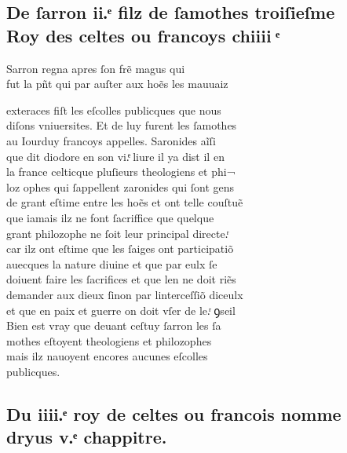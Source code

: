 \documentclass[12pt]{article}
\begin{document}
\subsection*{De ſarron ii.ͤ filz de ſamothes troiſieſme\protect\\ Roy des celtes ou francoys
          chiiii ͤ}


Sarron regna apres ſon frẽ magus qui\\
fut la pñt qui par auſter aux hoẽs les
          mauuaiz



\newpage




exteraces fiſt les eſcolles publicques que nous\\
diſons vniuersites.
          Et de luy furent les ſamothes\\
au Iourduy francoys appelles. Saronides aĩſi\\
que dit diodore en son vi.ͤ liure il ya dist il en\\
la
          france celticque pluſieurs theologiens et phi¬\\
loz ophes qui ſappellent
          zaronides qui ſont gens\\
de grant eſtime entre les hoẽs et ont telle couſtuẽ\\
que iamais ilz ne font ſacriffice que quelque\\
grant philozophe ne ſoit
          leur principal directe.ͬ\\
car ilz ont eſtime que les ſaiges ont participatiõ\\
auecques la nature diuine et que par eulx ſe\\
doiuent faire les
          ſacrifices et que len ne doit riẽs\\
demander aux dieux ſinon par linterceſſiõ
            diceulx\\
et que en paix et guerre on doit vſer de le.ͬ ꝯseil\\
Bien
          est vray que deuant ceſtuy ſarron les ſa\\
mothes eſtoyent theologiens et philozophes\\
mais ilz nauoyent encores aucunes
            eſcolles\\
publicques.





\subsection*{Du iiii.ͤ roy de celtes ou francois nomme\protect\\ dryus v.ͤ chappitre.}
\end{document}

